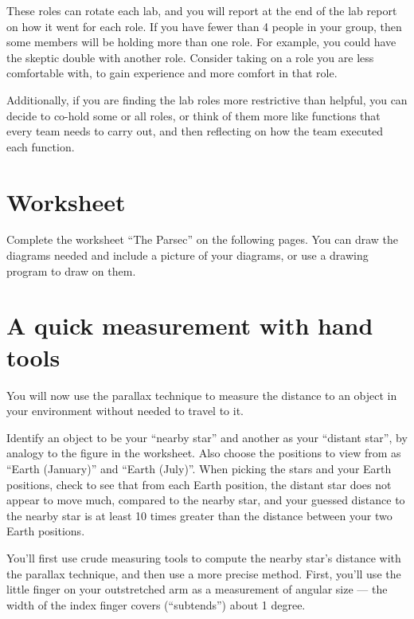 These roles can rotate each lab, and you will report at the end of the lab report on how it went for each role. If you have fewer than 4 people in your group, then some members will be holding more than one role. For example, you could have the skeptic double with another role. Consider taking on a role you are less comfortable with, to gain experience and more comfort in that role.

Additionally, if you are finding the lab roles more restrictive than helpful, you can decide to co-hold some or all roles, or think of them more like functions that every team needs to carry out, and then reflecting on how the team executed each function.

\section{Worksheet}

Complete the worksheet ``The Parsec'' on the following pages. You can draw the diagrams needed and include a picture of your diagrams, or use a drawing program to draw on them.



\section{A quick measurement with hand tools}

You will now use the parallax technique to measure the distance to an object in your environment without needed to travel to it.

\begin{steps}
	\item Identify an object to be your ``nearby star'' and another as your ``distant star'', by analogy to the figure in the worksheet. Also choose the positions to view from as ``Earth (January)'' and ``Earth (July)''. When picking the stars and your Earth positions, check to see that from each Earth position, the distant star does not appear to move much, compared to the nearby star, and your guessed distance to the nearby star is at least 10 times greater than the distance between your two Earth positions.
\end{steps}
	
You'll first use crude measuring tools to compute the nearby star's distance with the parallax technique, and then use a more precise method. First, you'll use the little finger on your outstretched arm as a measurement of angular size --- the width of the index finger covers (``subtends'') about 1 degree.


